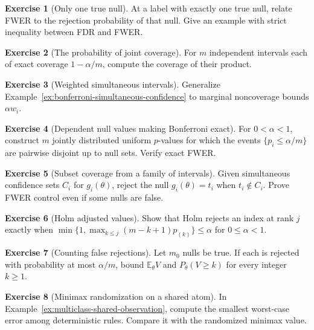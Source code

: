\documentclass[11pt,oneside]{book}
\theoremstyle{definition}
\newtheorem{exercise}{Exercise}[section]
\theoremstyle{remark}
\begin{document}
\begin{exercise}[Only one true null]
\label{exer:multiple-single-true-null}
At a label with exactly one true null, relate FWER to the rejection probability of that null. Give an example with strict inequality between FDR and FWER.
\end{exercise}

\begin{exercise}[The probability of joint coverage]
\label{exer:multiple-joint-coverage}
For $m$ independent intervals each of exact coverage $1-\alpha/m$, compute the coverage of their product.
\end{exercise}

\begin{exercise}[Weighted simultaneous intervals]
\label{exer:multiple-weighted-coverage}
Generalize Example~\ref{ex:bonferroni-simultaneous-confidence} to marginal noncoverage bounds $\alpha w_i$.
\end{exercise}

\begin{exercise}[Dependent null values making Bonferroni exact]
\label{exer:multiple-exact-bonferroni}
For $0<\alpha<1$, construct $m$ jointly distributed uniform $p$-values for which the events $\{p_i\leq\alpha/m\}$ are pairwise disjoint up to null sets. Verify exact FWER.
\end{exercise}

\begin{exercise}[Subset coverage from a family of intervals]
\label{exer:multiple-subset-coverage}
Given simultaneous confidence sets $C_i$ for $g_i(\theta)$, reject the null $g_i(\theta)=t_i$ when $t_i\notin C_i$. Prove FWER control even if some nulls are false.
\end{exercise}

\begin{exercise}[Holm adjusted values]
\label{exer:multiple-holm-adjusted}
Show that Holm rejects an index at rank $j$ exactly when $\min\{1,\max_{k\leq j}(m-k+1)p_{(k)}\}\leq\alpha$ for $0\leq\alpha<1$.
\end{exercise}

\begin{exercise}[Counting false rejections]
\label{exer:multiple-false-count-tails}
Let $m_0$ nulls be true. If each is rejected with probability at most $\alpha/m$, bound $\mathbb E_\theta V$ and $P_\theta(V\geq k)$ for every integer $k\geq1$.
\end{exercise}

\begin{exercise}[Minimax randomization on a shared atom]
\label{exer:multiple-deterministic-minimax}
In Example~\ref{ex:multiclass-shared-observation}, compute the smallest worst-case error among deterministic rules. Compare it with the randomized minimax value.
\end{exercise}
\end{document}
